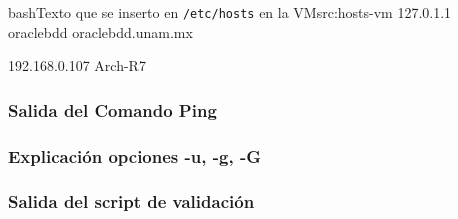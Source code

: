 \documentclass[./main.tex]{subfiles}
\begin{document}
\begin{codeCL}{bash}{Texto que se inserto en \texttt{/etc/hosts} en la VM}{src:hosts-vm}
127.0.1.1 oraclebdd oraclebdd.unam.mx

192.168.0.107 Arch-R7
\end{codeCL}


\subsubsection{Salida del Comando Ping}\label{sec:salida-del-comando}

\subsubsection{Explicación opciones -u, -g, -G}\label{sec:expl-opci-u}

\subsubsection{Salida del script de validación}\label{sec:salida-del-script}
\end{document}
